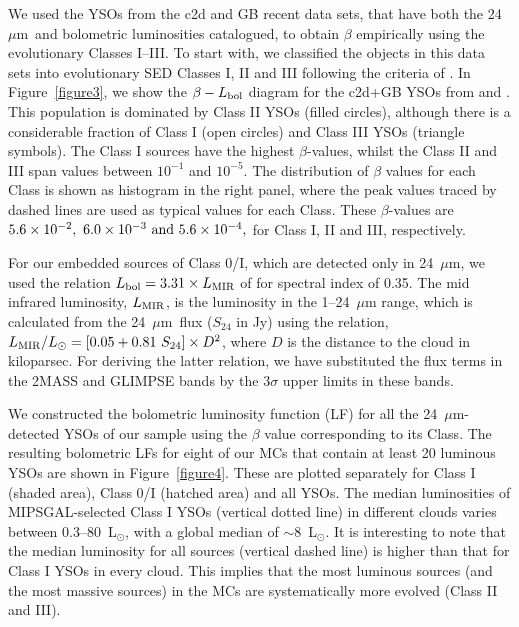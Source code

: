 \documentclass[iop]{emulateapj}
\newcommand{\lsun}{L$_{\odot}$}
\newcommand{\mipslam}{24~$\mu$m}
\begin{document}
We used the YSOs from the c2d and GB recent data sets, that have both the 
\mipslam\ and bolometric luminosities catalogued, to obtain $\beta$ empirically 
using the evolutionary Classes I--III. To start with, we classified the objects
in this data sets into evolutionary SED Classes I, II and III following
the criteria of \citet{green+94}. In Figure~\ref{figure3}, we show 
the $\beta-L_{\rm bol}$ diagram for the c2d+GB YSOs from 
\citet{evans+03} and \citet{dunham+15}. This population is dominated by Class II 
YSOs (filled circles), although there is a considerable fraction of Class I
(open circles) and Class III YSOs (triangle symbols). The Class I sources 
have the highest $\beta$-values, whilst the Class II and III
span values between $10^{-1}$ and $10^{-5}$. The distribution
of $\beta$ values for each Class is shown as histogram in the
right panel, where the peak values traced by dashed lines are used as 
typical values for each Class. These $\beta$-values are $\rm 5.6\times10^{-2},
~6.0\times10^{-3}~and~5.6\times10^{-4},$ for Class I, II and III, respectively.

For our embedded sources of Class 0/I, which are detected only in \mipslam,
we used the relation $L_{\rm bol}=3.31\times L_{\rm MIR}$ of \citet{kryukova+12}
for spectral index of 0.35.
The mid infrared luminosity, $L_{\rm MIR}$, is the luminosity in the 
1--24~$\mu$m range, which is calculated from the \mipslam\ flux ($S_{24}$ in Jy)
using the relation, $L_{\rm MIR}/L_\odot=[0.05+0.81~S_{24}]\times D^2$, 
where $D$ is the distance to the cloud in kiloparsec. For deriving the
latter relation, we have substituted the flux terms in the 2MASS and GLIMPSE 
bands by the 3$\sigma$ upper limits in these bands. 

We constructed the bolometric luminosity function (LF) for all the \mipslam-detected
YSOs of our sample using the $\beta$ value corresponding to its Class.
The resulting bolometric LFs for eight of our MCs that contain at least 20 
luminous YSOs are shown in Figure~\ref{figure4}.  %
These are plotted 
separately for Class I (shaded area), Class 0/I (hatched area) and all YSOs.
The median luminosities of MIPSGAL-selected Class I YSOs (vertical dotted line) 
in different clouds varies between 0.3--80~\lsun, with a global median of $\sim$8~\lsun.
It is interesting to note that the median luminosity for all sources (vertical dashed line)
is higher than that for Class I YSOs in every cloud. This implies that
the most luminous sources (and the most massive sources) in the MCs are 
systematically more evolved (Class II and III).
\end{document}
